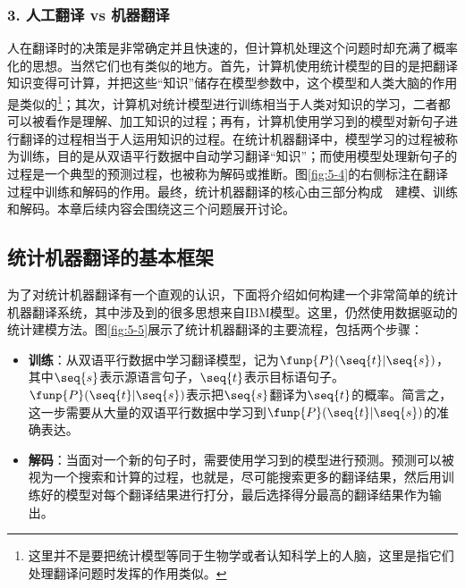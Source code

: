 \subsubsection{3. 人工翻译 vs 机器翻译}
\parinterval 人在翻译时的决策是非常确定并且快速的，但计算机处理这个问题时却充满了概率化的思想。当然它们也有类似的地方。首先，计算机使用统计模型的目的是把翻译知识变得可计算，并把这些“知识”储存在模型参数中，这个模型和人类大脑的作用是类似的\footnote{这里并不是要把统计模型等同于生物学或者认知科学上的人脑，这里是指它们处理翻译问题时发挥的作用类似。}；其次，计算机对统计模型进行训练相当于人类对知识的学习，二者都可以被看作是理解、加工知识的过程；再有，计算机使用学习到的模型对新句子进行翻译的过程相当于人运用知识的过程。在统计机器翻译中，模型学习的过程被称为训练，目的是从双语平行数据中自动学习翻译“知识”；而使用模型处理新句子的过程是一个典型的预测过程，也被称为解码或推断。图\ref{fig:5-4}的右侧标注在翻译过程中训练和解码的作用。最终，统计机器翻译的核心由三部分构成\ \dash \ 建模、训练和解码。本章后续内容会围绕这三个问题展开讨论。


\subsection{统计机器翻译的基本框架}

\parinterval 为了对统计机器翻译有一个直观的认识，下面将介绍如何构建一个非常简单的统计机器翻译系统，其中涉及到的很多思想来自IBM模型。这里，仍然使用数据驱动的统计建模方法。图\ref{fig:5-5}展示了统计机器翻译的主要流程，包括两个步骤：

\begin{itemize}
\vspace{0.5em}
\item {\small\sffamily\bfseries{训练}}：从双语平行数据中学习翻译模型，记为$\funp{P}(\seq{t}|\seq{s})$，其中$\seq{s}$表示源语言句子，$\seq{t}$表示目标语句子。$\funp{P}(\seq{t}|\seq{s})$表示把$\seq{s}$翻译为$\seq{t}$的概率。简言之，这一步需要从大量的双语平行数据中学习到$\funp{P}(\seq{t}|\seq{s})$的准确表达。
\vspace{0.5em}
\item {\small\sffamily\bfseries{解码}}：当面对一个新的句子时，需要使用学习到的模型进行预测。预测可以被视为一个搜索和计算的过程，也就是，尽可能搜索更多的翻译结果，然后用训练好的模型对每个翻译结果进行打分，最后选择得分最高的翻译结果作为输出。
\vspace{0.5em}
\end{itemize}

